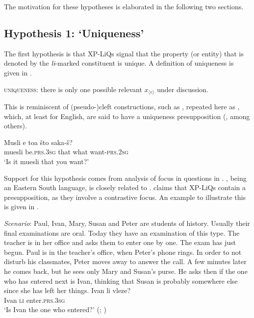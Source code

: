 \documentclass[output=paper]{langscibook}
\begin{document}
\noindent
The motivation for these hypotheses is elaborated in the following two sections.


\subsection{Hypothesis 1: `Uniqueness'}\label{sec:uniqueness}

The first hypothesis is that XP-LiQs signal that the property (or entity) that is denoted by the \textit{li}-marked constituent is unique. A definition of uniqueness is given in .


\ea \textsc{uniqueness}: there is only one possible relevant $x_{\langle e \rangle}$ under discussion. \label{uniqueness}
\z

\noindent
This is reminiscent of (pseudo-)cleft constructions, such as , repeated here as , which, at least for English, are said to have a uniqueness presupposition (\citealt{drenhaus2011}, among others).


\ea \gll Musli e toa što saka-š? \\
muesli be.\textsc{prs.3sg} that what want-\textsc{prs.2sg} \\
\glt `Is it muesli that you want?'
\label{cleft2}
\z

\noindent
Support for this hypothesis comes from  analysis of focus in questions in . , being an Eastern South  language, is closely related to . \citet{dukova2010} claims that XP-LiQs contain a presupposition, as they involve a contrastive focus. An example to illustrate this is given in .


\eanoraggedright
\eanoraggedright \textit{Scenario}: Paul, Ivan, Mary, Susan and Peter are students of history. Usually their final
examinations are oral. Today they have an examination of this type. The teacher is in her
office and asks them to enter one by one. The exam has just begun. Paul is in the teacher's
office, when Peter's phone rings. In order to not disturb his classmates, Peter moves away to
answer the call. A few minutes later he comes back, but he sees only Mary and Susan's purse.
He asks then if the one who has entered next is Ivan, thinking that Susan is probably
somewhere else since she has left her things.
\ex \gll Ivan li vleze? \\
Ivan \textsc{li} enter.\textsc{prs.3sg} \\
\glt `Is Ivan the one who entered?' \hfill (;  \citealt[258]{dukova2010})
\label{ivan}
\z\z
\end{document}
